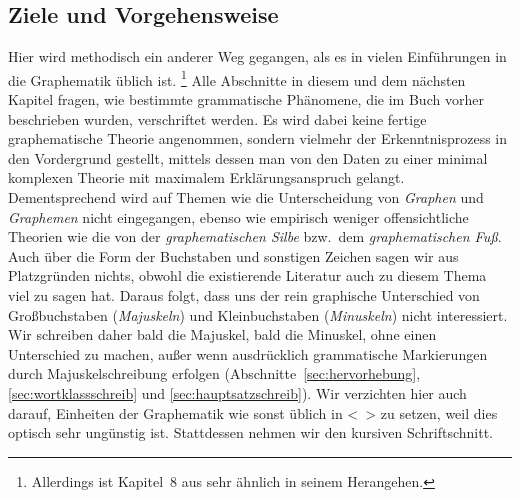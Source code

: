 \subsection{Ziele und Vorgehensweise}

Hier wird methodisch ein anderer Weg gegangen, als es in vielen Einführungen in die Graphematik üblich ist.%
\footnote{Allerdings ist Kapitel~8 aus \citet{Eisenberg1} sehr ähnlich in seinem Herangehen.}
Alle Abschnitte in diesem und dem nächsten Kapitel fragen, wie bestimmte grammatische Phänomene, die im Buch vorher beschrieben wurden, verschriftet werden.
Es wird dabei keine fertige graphematische Theorie angenommen, sondern vielmehr der Erkenntnisprozess in den Vordergrund gestellt, mittels dessen man von den Daten zu einer minimal komplexen Theorie mit maximalem Erklärungsanspruch gelangt.
Dementsprechend wird auf Themen wie \zB die Unterscheidung von \textit{Graphen} und \textit{Graphemen} nicht eingegangen, ebenso wie empirisch weniger offensichtliche Theorien wie die von der \textit{graphematischen Silbe} bzw.\ dem \textit{graphematischen Fuß}.
Auch über die Form der Buchstaben und sonstigen Zeichen sagen wir aus Platzgründen nichts, obwohl die existierende Literatur auch zu diesem Thema viel zu sagen hat.
Daraus folgt, dass uns der rein graphische Unterschied von Großbuchstaben (\textit{Majuskeln}) und Kleinbuchstaben (\textit{Minuskeln}) nicht interessiert.
Wir schreiben daher bald die Majuskel, bald die Minuskel, ohne einen Unterschied zu machen, außer wenn ausdrücklich grammatische Markierungen durch Majuskelschreibung erfolgen (Abschnitte~\ref{sec:hervorhebung}, \ref{sec:wortklassschreib} und \ref{sec:hauptsatzschreib}).
Wir verzichten hier auch darauf, Einheiten der Graphematik wie sonst üblich in <~> zu setzen, weil dies optisch sehr ungünstig ist.
Stattdessen nehmen wir den kursiven Schriftschnitt.

